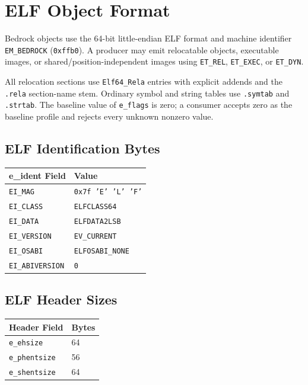 \documentclass[10pt,twoside]{article}
\begin{document}
\clearpage
\section{ELF Object Format}\label{page:elf-object-format}
Bedrock objects use the 64-bit little-endian ELF format and machine identifier
\texttt{EM\_\allowbreak{}BEDROCK} (\texttt{0xffb0}). A producer may
emit relocatable objects, executable images, or shared/position-independent
images using \texttt{ET\_REL}, \texttt{ET\_EXEC}, or \texttt{ET\_DYN}.

All relocation sections use \texttt{Elf64\_Rela} entries with explicit
addends and the \texttt{.rela} section-name stem. Ordinary symbol and string
tables use \texttt{.symtab} and \texttt{.strtab}. The baseline value of
\texttt{e\_flags} is zero; a consumer accepts zero as the baseline profile and
rejects every unknown nonzero value.

\subsection{ELF Identification Bytes}
\begingroup\footnotesize
\setlength{\tabcolsep}{2pt}
\begin{longtable}{@{}p{1.55in}p{3.95in}@{}}
\toprule
\textbf{e\_ident Field} & \textbf{Value}\\
\midrule
\endhead
\texttt{EI\_\allowbreak{}MAG} & \texttt{0x7f 'E' 'L' 'F'}\\
\texttt{EI\_\allowbreak{}CLASS} & \texttt{ELFCLASS64}\\
\texttt{EI\_\allowbreak{}DATA} & \texttt{ELFDATA2LSB}\\
\texttt{EI\_\allowbreak{}VERSION} & \texttt{EV\_\allowbreak{}CURRENT}\\
\texttt{EI\_\allowbreak{}OSABI} & \texttt{ELFOSABI\_\allowbreak{}NONE}\\
\texttt{EI\_\allowbreak{}ABIVERSION} & \texttt{0}\\
\bottomrule
\end{longtable}
\endgroup
\subsection{ELF Header Sizes}
\begingroup\footnotesize
\setlength{\tabcolsep}{2pt}
\begin{longtable}{@{}p{1.55in}p{3.95in}@{}}
\toprule
\textbf{Header Field} & \textbf{Bytes}\\
\midrule
\endhead
\texttt{e\_\allowbreak{}ehsize} & 64\\
\texttt{e\_\allowbreak{}phentsize} & 56\\
\texttt{e\_\allowbreak{}shentsize} & 64\\
\bottomrule
\end{longtable}
\endgroup
\end{document}
